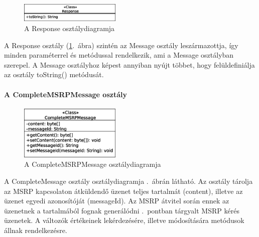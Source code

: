 \begin{figure}
  \vspace{-15pt}
  \begin{center}
    \includegraphics[width=0.43\textwidth]{img/class_diagrams/Response.eps}
  \end{center}
  \vspace{-15pt}
  \captionsetup{font=scriptsize}
  \caption{A Response osztálydiagramja}
   \label{fig:class_response}
  \vspace{-10pt}
\end{figure}
A Response osztály (\ref{fig:class_response}.~ábra) szintén az Message osztály leszármazottja, így minden paraméterrel és metódussal rendelkezik, ami a Message osztályban szerepel. A Message osztályhoz képest annyiban nyújt többet, hogy felüldefiniálja az osztály toString() metódusát.

\paragraph{A CompleteMSRPMessage osztály\\}
\label{sec:msrp_completmsrpemessage}

\begin{figure}
  \vspace{-15pt}
  \begin{center}
    \includegraphics[width=0.43\textwidth]{img/class_diagrams/CompleteMSRPMessage.eps}
  \end{center}
  \vspace{-15pt}
  \captionsetup{font=scriptsize}
  \caption{A CompleteMSRPMessage osztálydiagramja}
   \label{fig:class_completmsrpemessage}
  \vspace{-10pt}
\end{figure}
A CompleteMessage osztály osztálydiagramja .~ábrán látható. Az osztály tárolja az MSRP kapcsolaton átküldendő üzenet teljes tartalmát (content), illetve az üzenet egyedi azonosítóját (messageId). Az MSRP átvitel során ennek az üzenetnek a tartalmából fognak generálódni .~pontban tárgyalt MSRP kérés üzenetek. A változók értékeinek lekérdezésére, illetve módosítására metódusok állnak rendelkezésre.

